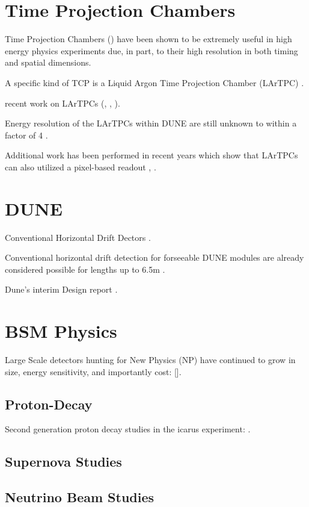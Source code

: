 \section{Time Projection Chambers}

Time Projection Chambers (\citep{lartpc:nygren}) have been shown to be extremely useful in high energy physics experiments due, in part, to their high resolution in both timing and spatial dimensions.

A specific kind of TCP is a Liquid Argon Time Projection Chamber (LArTPC) \citep{rubbia1977liquid}.

recent work on LArTPCs (\citep{ArgoNeuT:PhysRevD.99.012002}, \citep{MicroBooNE:Acciarri_2017}, \citep{LArIAT:Acciarri_2020}).

Energy resolution of the LArTPCs within DUNE are still unknown to within a factor of 4 \citep{lartpc_energy_resolution:PhysRevD.99.036009}.

Additional work has been performed in recent years which show that LArTPCs can also utilized a pixel-based readout \citep{larpix:Dwyer_2018}, \citep{Asaadi_2018}.

\section{DUNE}

Conventional Horizontal Drift Dectors \citep{DUNE-FD:Abi_2020}.

Conventional horizontal drift detection for forseeable DUNE modules are already considered possible for lengths up to 6.5m \citep{DUNE_Vertical:Paulucci_2022}.

Dune's interim Design report \citep{DUNE_FD_TDR_2020}.

\section{BSM Physics}

Large Scale detectors hunting for New Physics (NP) have continued to grow in size, energy sensitivity, and importantly cost: [\citep{Juno:2022103927}].

\subsection{Proton-Decay}

Second generation proton decay studies in the icarus experiment: \citep{ICARUS_2001}.

\subsection{Supernova Studies}

\subsection{Neutrino Beam Studies}